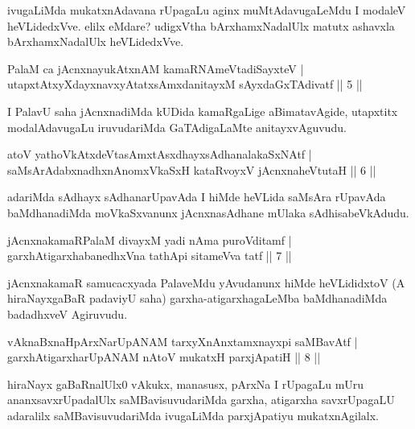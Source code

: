 \begin{artha}
ivugaLiMda mukatxnAdavana rUpagaLu aginx muMtAdavugaLeMdu I modaleV heVLidedxVve. elilx eMdare? udigxVtha bArxhamxNadalUlx matutx ashavxla bArxhamxNadalUlx heVLidedxVve.
\end{artha}


\begin{shl}
PalaM ca jAcnxnayukAtxnAM kamaRNAmeVtadiSayxteV |\\
utapxtAtxyXdayxnavxyAtatxsAmxdanitayxM sAyxdaGxTAdivatf \hfill || 5 ||
\end{shl}

\begin{artha}
I PalavU saha jAcnxnadiMda kUDida kamaRgaLige aBimatavAgide, utapxtitx modalAdavugaLu iruvudariMda GaTAdigaLaMte anitayxvAguvudu.
\end{artha}

\begin{shl}
atoV yathoVkAtxdeVtasAmxtAsxdhayxsAdhanalakaSxNAtf |\\
saMsArAdabxnadhxnAnomxVkaSxH kataRvoyxV jAcnxnaheVtutaH \hfill || 6 ||
\end{shl}

\begin{artha}
adariMda sAdhayx sAdhanarUpavAda I hiMde heVLida saMsAra rUpavAda baMdhanadiMda moVkaSxvanunx jAcnxnasAdhane mUlaka sAdhisabeVkAdudu.
\end{artha}


\begin{shl}
jAcnxnakamaRPalaM divayxM yadi nAma puroVditamf |\\
garxhAtigarxhabanedhxVna tathA\s pi sitameVva tatf \hfill || 7 || 
\end{shl}

\begin{artha}
jAcnxnakamaR samucacxyada PalaveMdu yAvudanunx hiMde heVLididxtoV (A hiraNayxgaBaR padaviyU saha) garxha-atigarxhagaLeMba baMdhanadiMda badadhxveV Agiruvudu.
\end{artha}

\begin{shl}
vAknaBxnaHpArxNarUpANAM tarxyXnAnxtamxnayxpi saMBavAtf |\\
garxhAtigarxharUpANAM nAtoV mukatxH parxjApatiH \hfill || 8 ||
\end{shl}

\begin{artha}
hiraNayx gaBaRnalUlx0 vAkukx, manasusx, pArxNa I rUpagaLu mUru ananxsavxrUpadalUlx saMBavisuvudariMda garxha, atigarxha savxrUpagaLU adaralilx saMBavisuvudariMda ivugaLiMda parxjApatiyu mukatxnAgilalx.
\end{artha}

